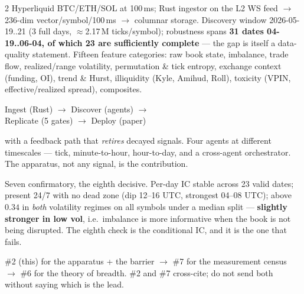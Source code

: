 \documentclass[10pt,a4paper]{article}
\begin{document}
\begin{multicols}{2}
Hyperliquid BTC/ETH/SOL at 100\,ms; Rust ingestor on the L2 WS feed $\to$ 236-dim vector/symbol/100\,ms
$\to$ columnar storage. Discovery window 2026-05-19..21 (3 full days, $\approx$2.17\,M ticks/symbol);
robustness spans \textbf{31 dates 04-19..06-04, of which 23 are sufficiently complete} — the gap is
itself a data-quality statement.
Fifteen feature categories: raw book state, imbalance, trade flow, realized/range volatility,
permutation \& tick entropy, exchange context (funding, OI), trend \& Hurst, illiquidity (Kyle, Amihud,
Roll), toxicity (VPIN, effective/realized spread), composites.

\begin{center}
Ingest (Rust) $\to$ Discover (agents) $\to$\\
Replicate (5 gates) $\to$ Deploy (paper)
\end{center}
with a feedback path that \emph{retires} decayed signals. Four agents at different timescales — tick,
minute-to-hour, hour-to-day, and a cross-agent orchestrator. The apparatus, not any signal, is the
contribution.

Seven confirmatory, the eighth decisive. Per-day IC stable across 23 valid dates; present 24/7 with no
dead zone (dip 12--16 UTC, strongest 04--08 UTC); above $0.34$ in \emph{both} volatility regimes on all
symbols under a median split — \textbf{slightly stronger in low vol}, i.e.\ imbalance is more informative
when the book is not being disrupted. The eighth check is the conditional IC, and it is the one that
fails.

\#2 (this) for the apparatus + the barrier $\to$ \#7 for the measurement census $\to$ \#6 for the
theory of breadth. \#2 and \#7 cross-cite; do not send both without saying which is the lead.

\end{multicols}

\end{document}
